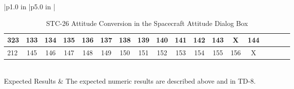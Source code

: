 \begin{table}[htbp!]
\begin{tabular}{|p{1.0 in} |p{5.0 in} |}
\begin{centering}
\begin{tabular}{|l|c|c|c|c|c|c|c|c|c|c|c|c|c|c|c|c|c|}
             323 & 133 & 134 & 135 & 136 & 137 & 138 & 139 & 140 & 141 & 142 & 143 & X & 144  \\ \hline
             212 & 145 & 146 & 147 & 148 & 149 & 150 & 151 & 152 & 153 & 154 & 155 & 156 & X  \\ \hline
          \end{tabular}
          \end{centering} \vspace{0.1 in}\\
         \hline
         Expected Results & The expected numeric results are described above and in TD-8.\\
      \hline
\end{tabular}
   \label{Table:STC-26}
   \caption{STC-26 Attitude Conversion in the Spacecraft Attitude Dialog Box}
\end{table} 